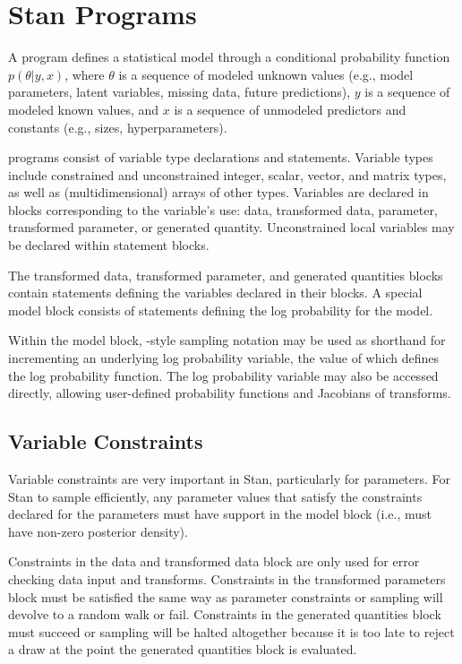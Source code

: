 \section{Stan Programs}

A \Stan program defines a statistical model through a conditional
probability function $p(\theta|y,x)$, where $\theta$ is a sequence of
modeled unknown values (e.g., model parameters, latent variables, missing
data, future predictions), $y$ is a sequence of modeled known
values, and $x$ is a sequence of unmodeled predictors and constants
(e.g., sizes, hyperparameters).

\Stan programs consist of variable type declarations and statements.
Variable types include constrained and unconstrained integer, scalar,
vector, and matrix types, as well as (multidimensional) arrays of
other types.  Variables are declared in blocks corresponding to the
variable's use: data, transformed data, parameter, transformed
parameter, or generated quantity.  Unconstrained local variables may
be declared within statement blocks.  

The transformed data, transformed parameter, and generated quantities
blocks contain statements defining the variables declared in their
blocks.  A special model block consists of statements defining the log
probability for the model.

Within the model block, \BUGS-style sampling notation may be used as
shorthand for incrementing an underlying log probability variable, the
value of which defines the log probability function.  The log
probability variable may also be accessed directly, allowing
user-defined probability functions and Jacobians of transforms.

\subsection{Variable Constraints}

Variable constraints are very important in Stan, particularly for
parameters.  For Stan to sample efficiently, any parameter values that
satisfy the constraints declared for the parameters must have support
in the model block (i.e., must have non-zero posterior density).

Constraints in the data and transformed data block are only used for
error checking data input and transforms.  Constraints in the
transformed parameters block must be satisfied the same way as
parameter constraints or sampling will devolve to a random walk or
fail.  Constraints in the generated quantities block must succeed or
sampling will be halted altogether because it is too late to reject
a draw at the point the generated quantities block is evaluated.

